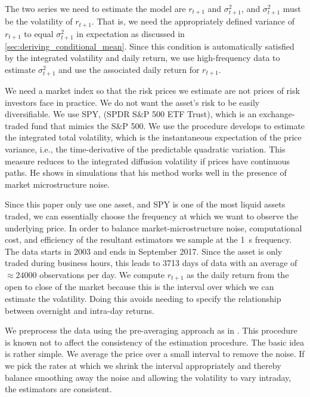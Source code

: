 \documentclass[11pt, letterpaper, twoside]{article}
\begin{document}
The two series we need to estimate the model are $r_{t+1}$ and $\sigma^2_{t+1}$, and $\sigma^2_{t+1}$ must be the volatility of $r_{t+1}$. That is, we need the appropriately defined variance of $r_{t+1}$ to equal $\sigma^2_{t+1}$ in expectation as discussed in \cref{sec:deriving_conditional_mean}. Since this condition is automatically satisfied by the integrated volatility and daily return, we use high-frequency data to estimate $\sigma^2_{t+1}$ and use the associated daily return for $r_{t+1}$. 

We need a market index so that the risk prices we estimate are not prices of risk investors face in practice. We do not want the asset's risk to be easily diversifiable. We use SPY, (SPDR S\&P 500 ETF Trust), which is an exchange-traded fund that mimics the S\&P 500.  We use the procedure \textcite{sangrey2018jumps} develops to estimate the integrated total volatility, which is the instantaneous expectation of the price variance, i.e., the time-derivative of the predictable quadratic variation. This measure reduces to the integrated diffusion volatility if prices have continuous paths. He shows in simulations that his method works well in the presence of market microstructure noise.

Since this paper only use one asset, and SPY is one of the most liquid assets traded, we can essentially choose the frequency at which we want to observe the underlying price. In order to balance market-microstructure noise, computational cost, and efficiency of the resultant estimators we sample at the \SI{1}{\second} frequency. The data starts in 2003 and ends in September 2017. Since the asset is only traded during business hours, this leads to \num{3713} days of data with an average of $\approx \num{24000}$ observations per day. We compute $r_{t+1}$ as the daily return from the open to close of the market because this is the interval over which we can estimate the volatility. Doing this avoids needing  to specify the relationship between overnight and intra-day returns. 

We preprocess the data using the pre-averaging approach as in \textcites{podolskij2009bipower, aitsahalia2012testing}. This procedure is known not to affect the consistency of the estimation procedure. The basic idea is rather simple. We average the price over a small interval to remove the noise. If we pick the rates at which we shrink the interval appropriately and thereby balance smoothing away the noise and allowing the volatility to vary intraday, the estimators are consistent.
\end{document}
